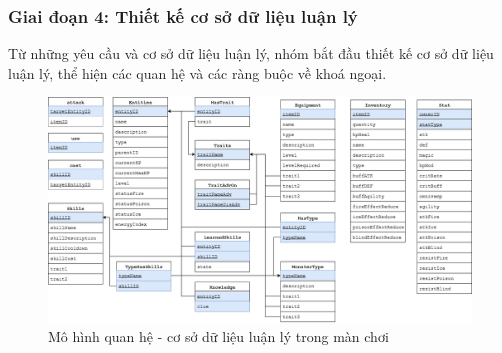 \subsubsection{Giai đoạn 4: Thiết kế cơ sở dữ liệu luận lý}
\hspace*{0.5cm} Từ những yêu cầu và cơ sở dữ liệu luận lý, nhóm bắt đầu thiết kế cơ sở dữ liệu luận lý, thể hiện các quan hệ và các ràng buộc về khoá ngoại.
\begin{figure}[H]
	\centering
	\includegraphics[width=\textwidth]{Images/Schemav3.drawio.png}
	\vspace{0.5cm}
	\caption{Mô hình quan hệ - cơ sở dữ liệu luận lý trong màn chơi}
\end{figure}

